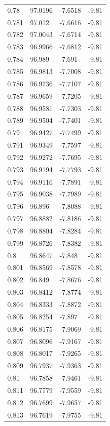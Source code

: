 \begin{tabular}{llll}
0.78 & 97.0196 & -7.6518 & -9.81 \\
0.781 & 97.012 & -7.6616 & -9.81 \\
0.782 & 97.0043 & -7.6714 & -9.81 \\
0.783 & 96.9966 & -7.6812 & -9.81 \\
0.784 & 96.989 & -7.691 & -9.81 \\
0.785 & 96.9813 & -7.7008 & -9.81 \\
0.786 & 96.9736 & -7.7107 & -9.81 \\
0.787 & 96.9659 & -7.7205 & -9.81 \\
0.788 & 96.9581 & -7.7303 & -9.81 \\
0.789 & 96.9504 & -7.7401 & -9.81 \\
0.79 & 96.9427 & -7.7499 & -9.81 \\
0.791 & 96.9349 & -7.7597 & -9.81 \\
0.792 & 96.9272 & -7.7695 & -9.81 \\
0.793 & 96.9194 & -7.7793 & -9.81 \\
0.794 & 96.9116 & -7.7891 & -9.81 \\
0.795 & 96.9038 & -7.7989 & -9.81 \\
0.796 & 96.896 & -7.8088 & -9.81 \\
0.797 & 96.8882 & -7.8186 & -9.81 \\
0.798 & 96.8804 & -7.8284 & -9.81 \\
0.799 & 96.8726 & -7.8382 & -9.81 \\
0.8 & 96.8647 & -7.848 & -9.81 \\
0.801 & 96.8569 & -7.8578 & -9.81 \\
0.802 & 96.849 & -7.8676 & -9.81 \\
0.803 & 96.8412 & -7.8774 & -9.81 \\
0.804 & 96.8333 & -7.8872 & -9.81 \\
0.805 & 96.8254 & -7.897 & -9.81 \\
0.806 & 96.8175 & -7.9069 & -9.81 \\
0.807 & 96.8096 & -7.9167 & -9.81 \\
0.808 & 96.8017 & -7.9265 & -9.81 \\
0.809 & 96.7937 & -7.9363 & -9.81 \\
0.81 & 96.7858 & -7.9461 & -9.81 \\
0.811 & 96.7779 & -7.9559 & -9.81 \\
0.812 & 96.7699 & -7.9657 & -9.81 \\
0.813 & 96.7619 & -7.9755 & -9.81 \\

\end{tabular}
